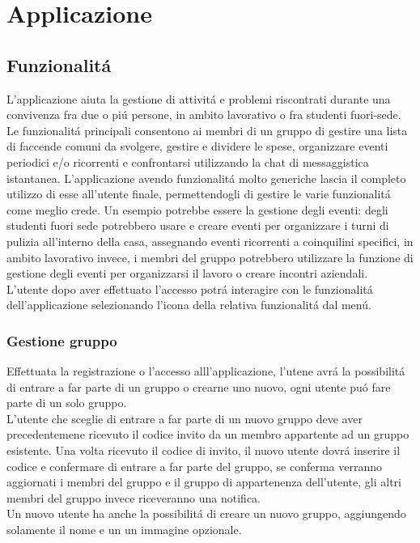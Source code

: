 \chapter{Applicazione}                %
\lhead[\fancyplain{}{\bfseries\thepage}]{\fancyplain{}{\bfseries\rightmark}}



\section{Funzionalit\'a}                 %
L'applicazione aiuta la gestione di attivit\'a e problemi riscontrati durante una convivenza fra due o pi\'u persone, in ambito lavorativo o fra studenti fuori-sede.\\
Le funzionalit\'a principali consentono ai membri di un gruppo di gestire una lista di faccende comuni da svolgere, gestire e dividere le spese, organizzare eventi periodici e/o ricorrenti e confrontarsi utilizzando la chat di messaggistica istantanea.
L'applicazione avendo funzionalit\'a molto generiche lascia il completo utilizzo di esse all'utente finale, permettendogli di gestire le varie funzionalit\'a come meglio crede. Un esempio potrebbe essere la gestione degli eventi: degli studenti fuori sede potrebbero usare e creare eventi per organizzare i turni di pulizia all'interno della casa, assegnando eventi ricorrenti a coinquilini specifici, in ambito lavorativo invece, i membri del gruppo potrebbero utilizzare la funzione di gestione degli eventi per organizzarsi il lavoro o creare incontri aziendali.\\
L'utente dopo aver effettuato l'accesso potr\'a interagire con le funzionalit\'a dell'applicazione selezionando l'icona della relativa funzionalit\'a dal men\'u.





\subsection{Gestione gruppo}
Effettuata la registrazione o l'accesso alll'applicazione, l'utene avr\'a la possibilit\'a di entrare a far parte di un gruppo o crearne uno nuovo, ogni utente pu\'o fare parte di un solo gruppo.\\
L'utente che sceglie di entrare a far parte di un nuovo gruppo deve aver precedentemene ricevuto il codice invito da un membro appartente ad un gruppo esistente. Una volta ricevuto il codice di invito, il nuovo utente dovr\'a inserire il codice e confermare di entrare a far parte del gruppo, se conferma verranno aggiornati i membri del gruppo e il gruppo di appartenenza dell'utente, gli altri membri del gruppo invece riceveranno una notifica.\\
Un nuovo utente ha anche la possibilit\'a di creare un nuovo gruppo, aggiungendo solamente il nome e un un immagine opzionale.

